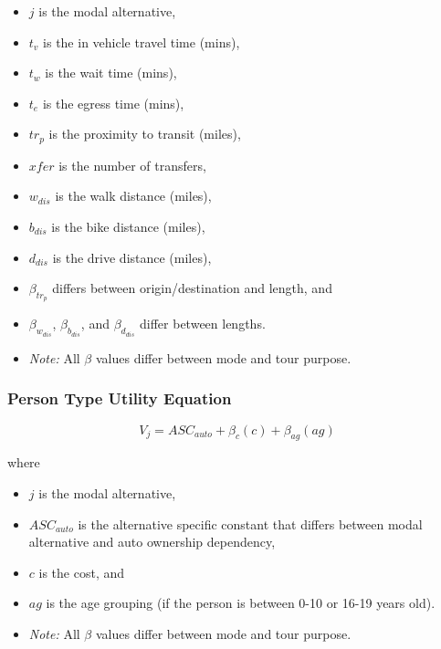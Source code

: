 \documentclass[12pt, oneside, openright]{byuthesis}
\providecommand{\tightlist}{%
  \setlength{\itemsep}{0pt}\setlength{\parskip}{0pt}}
\begin{document}
\begin{itemize}
\tightlist
\item
  \(j\) is the modal alternative,
\item
  \(t_v\) is the in vehicle travel time (mins),
\item
  \(t_w\) is the wait time (mins),
\item
  \(t_e\) is the egress time (mins),
\item
  \(tr_p\) is the proximity to transit (miles),
\item
  \(xfer\) is the number of transfers,
\item
  \(w_{dis}\) is the walk distance (miles),
\item
  \(b_{dis}\) is the bike distance (miles),
\item
  \(d_{dis}\) is the drive distance (miles),
\item
  \(\beta_{tr_p}\) differs between origin/destination and length, and
\item
  \(\beta_{w_{dis}}\), \(\beta_{b_{dis}}\), and \(\beta_{d_{dis}}\) differ between lengths.
\item
  \emph{Note:} All \(\beta\) values differ between mode and tour purpose.
\end{itemize}

\hypertarget{person-type-utility-equation}{%
\subsubsection{Person Type Utility Equation}\label{person-type-utility-equation}}

\begin{equation}
  V_j = ASC_{auto} +  \beta_{c}(c) + \beta_{ag}(ag) \label{eq:tpcmperson}
\end{equation}

where

\begin{itemize}
\tightlist
\item
  \(j\) is the modal alternative,
\item
  \(ASC_{auto}\) is the alternative specific constant that differs between modal alternative and auto ownership dependency,
\item
  \(c\) is the cost, and
\item
  \(ag\) is the age grouping (if the person is between 0-10 or 16-19 years old).
\item
  \emph{Note:} All \(\beta\) values differ between mode and tour purpose.
\end{itemize}
\end{document}
